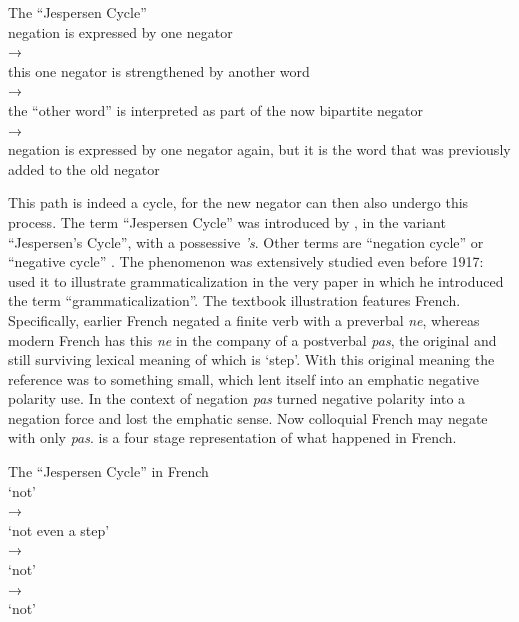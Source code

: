 ﻿\documentclass[output=paper,draft,draftmode,colorlinks,citecolor=brown]{langscibook}
\begin{document}
\newpage
\begin{exe}\ex\label{ex:int-jespersen}
          The ``Jespersen Cycle'' \\[1ex]
negation is expressed by one negator\\ 
→\\
this one negator is strengthened by another word\\ 
→\\ 
the ``other word'' is interpreted as part of the now bipartite negator\\
→\\ 
negation is expressed by one negator again, but it is the word that was previously added to the old negator 
    \end{exe}
%
This path is indeed a cycle, for the new negator can then also undergo this
process. The term ``Jespersen Cycle'' was introduced by \textcite{Dahl1979}, in
the variant ``Jespersen's Cycle'', with a possessive \textit{'s}. Other
terms are ``negation cycle'' \parencite[e.g.][]{Schwegler1983} or ``negative
cycle'' \parencites(e.g.)(){Gelderen2011}{Mithun2016}. The
phenomenon was extensively studied even before 1917: \textcite{Meillet1912}
used it to illustrate grammaticalization in the very paper in which he
introduced the term ``grammaticalization''. The textbook illustration
features French. Specifically, earlier French negated a finite verb with a
preverbal \textit{ne}, whereas modern French has this \textit{ne} in the company of
a postverbal \textit{pas}, the original and still surviving lexical meaning
of which is `step'. With this original meaning the reference was to
something small, which lent itself into an emphatic negative polarity use. In the context of negation \textit{pas} turned negative polarity
into a negation force and lost the emphatic sense. Now colloquial French
may negate with only \textit{pas}.  is a four stage
representation of what happened in French.
%
\begin{exe}\ex\label{ex:int-jespersen-french}
          The ``Jespersen Cycle'' in French\\[1ex]
           `not'      \\
    →                      \\
      `not even a step'  \\
    →                                          \\
      `not'              \\
    →                                          \\
                `not'              
  \end{exe}
\end{document}
